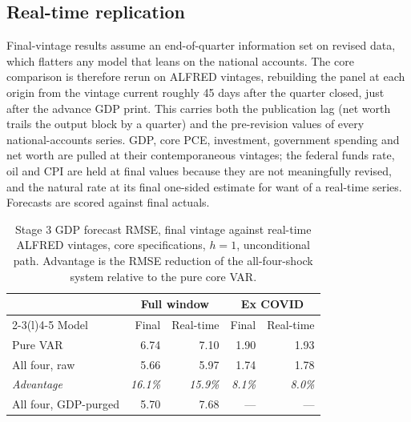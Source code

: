 \documentclass[conference]{IEEEtran}
\begin{document}
\subsection{Real-time replication}
Final-vintage results assume an end-of-quarter information set on revised data, which flatters any model that leans on the national accounts. The core comparison is therefore rerun on ALFRED vintages, rebuilding the panel at each origin from the vintage current roughly 45 days after the quarter closed, just after the advance GDP print. This carries both the publication lag (net worth trails the output block by a quarter) and the pre-revision values of every national-accounts series. GDP, core PCE, investment, government spending and net worth are pulled at their contemporaneous vintages; the federal funds rate, oil and CPI are held at final values because they are not meaningfully revised, and the natural rate at its final one-sided estimate for want of a real-time series. Forecasts are scored against final actuals.

\begin{table}[t]
\caption{Stage 3 GDP forecast RMSE, final vintage against real-time ALFRED vintages, core specifications, $h=1$, unconditional path. Advantage is the RMSE reduction of the all-four-shock system relative to the pure core VAR.}
\label{tab:rt}
\centering
\small
\setlength{\tabcolsep}{4pt}
\begin{tabular}{@{}lrrrr@{}}
\toprule
& \multicolumn{2}{c}{Full window} & \multicolumn{2}{c}{Ex COVID} \\
\cmidrule(l){2-3}\cmidrule(l){4-5}
Model & Final & Real-time & Final & Real-time \\
\midrule
Pure VAR & 6.74 & 7.10 & 1.90 & 1.93 \\
All four, raw & 5.66 & 5.97 & 1.74 & 1.78 \\
\emph{Advantage} & \emph{16.1\%} & \emph{15.9\%} & \emph{8.1\%} & \emph{8.0\%} \\
All four, GDP-purged & 5.70 & 7.68 & --- & --- \\
\bottomrule
\end{tabular}
\end{table}
\end{document}
